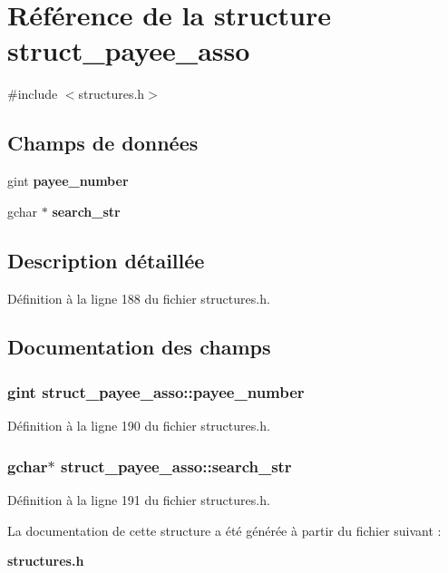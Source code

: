 \section{Référence de la structure struct\_\-payee\_\-asso}
\label{structstruct__payee__asso}


{\ttfamily \#include $<$structures.h$>$}

\subsection*{Champs de données}
\begin{DoxyCompactItemize}
\item 
gint {\bf payee\_\-number}
\item 
gchar $\ast$ {\bf search\_\-str}
\end{DoxyCompactItemize}


\subsection{Description détaillée}


Définition à la ligne 188 du fichier structures.h.



\subsection{Documentation des champs}
\subsubsection[{payee\_\-number}]{\setlength{\rightskip}{0pt plus 5cm}gint {\bf struct\_\-payee\_\-asso::payee\_\-number}}\label{structstruct__payee__asso_a7329817d04cb09669673903293809b57}


Définition à la ligne 190 du fichier structures.h.

\subsubsection[{search\_\-str}]{\setlength{\rightskip}{0pt plus 5cm}gchar$\ast$ {\bf struct\_\-payee\_\-asso::search\_\-str}}\label{structstruct__payee__asso_a8c3e7ca460bc86da0cc0c19d13999ee0}


Définition à la ligne 191 du fichier structures.h.



La documentation de cette structure a été générée à partir du fichier suivant :\begin{DoxyCompactItemize}
\item 
{\bf structures.h}\end{DoxyCompactItemize}
